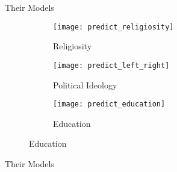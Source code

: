 \documentclass{beamer}
\begin{document}
\begin{frame}{Their Models}
	\begin{figure}[htbp]
		\begin{mdframed}[
			skipabove=0.5\baselineskip, %
			skipbelow=0.5\baselineskip, %
			linewidth=1pt, %
			innerleftmargin=10pt, %
			innerrightmargin=10pt, %
			innertopmargin=10pt, %
			innerbottommargin=10pt, %
			]
			\centering
			\caption{Religiosity, ideology, education, and social distance}
			\label{fig:Religiosity_ideology_education_social_distance}
			\begin{subfigure}[b]{0.3\textwidth} %
				\centering
				\texttt{[image: predict\_religiosity]} %
				\caption{Religiosity}
				\label{fig:predict_religiosity}
			\end{subfigure}\hfill
			\begin{subfigure}[b]{0.3\textwidth} %
				\centering
				\texttt{[image: predict\_left\_right]} %
				\caption{Political Ideology}
				\label{fig:predict_leftright}
			\end{subfigure}\hfill
			\begin{subfigure}[b]{0.3\textwidth} %
				\centering
				\texttt{[image: predict\_education]} %
				\caption{Education}
				\label{fig:predict_education}
			\end{subfigure}
		\end{mdframed}
	\end{figure}
\end{frame}



\begin{frame}{Their Models}
	\begin{minipage}[t]{0.48\textwidth} %
		\vspace{0pt} %
		\begin{center}
		\end{center}
	\end{minipage}\hfill
	\begin{minipage}[t]{0.48\textwidth} %
		\vspace{0pt} %
		\begin{center}
		\end{center}
	\end{minipage}
\end{frame}
\end{document}
